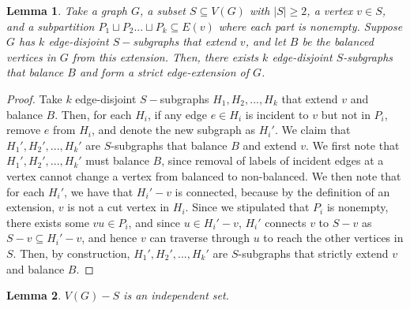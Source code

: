 \documentclass{article}
\newtheorem{lemma}{Lemma}[section]
\begin{document}
\begin{lemma}\label{lem:strict-extn}
    Take a graph $G$, a subset $S \subseteq V(G)$ with $|S| \geq 2$, a vertex $v \in S$, and a subpartition $P_1 \sqcup P_2 ... \sqcup P_k \subseteq E(v)$ where each part \emph{is nonempty}. Suppose $G$ has $k$ edge-disjoint $S-$subgraphs that extend $v$, and let $B$ be the balanced vertices in $G$ from this extension. Then, there exists $k$ edge-disjoint $S$-subgraphs that balance $B$ and form a strict edge-extension of $G$. 
\end{lemma}

\begin{proof}
    Take $k$ edge-disjoint $S-$subgraphs $H_1,H_2,...,H_k$ that extend $v$ and balance $B$. Then, for each $H_i$, if any edge $e \in H_i$ is incident to $v$ but not in $P_i$, remove $e$ from $H_i$, and denote the new subgraph as $H_i'$. We claim that $H_1', H_2',...,H_k'$ are $S$-subgraphs that balance $B$ and extend $v$. We first note that $H_1',H_2',...,H_k'$ must balance $B$, since removal of labels of incident edges at a vertex cannot change a vertex from balanced to non-balanced. We then note that for each $H_i'$, we have that $H_i'-v$ is connected, because by the definition of an extension, $v$ is not a cut vertex in $H_i$. Since we stipulated that $P_i$ is nonempty, there exists some $vu \in P_i$, and since $u \in H_i'-v$, $H_i'$ connects $v$ to $S-v$ as $S-v \subseteq H_i'-v$, and hence $v$ can traverse through $u$ to reach the other vertices in $S$. Then, by construction, $H_1',H_2',...,H_k'$ are $S$-subgraphs that strictly extend $v$ and balance $B$.
\end{proof}

\begin{lemma}\label{lem:indset}
    $V(G)-S$ is an independent set. 
\end{lemma}
\end{document}
